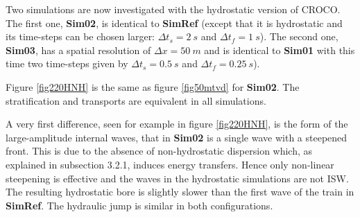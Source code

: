  Two simulations are now investigated with the hydrostatic version of CROCO. The first one, \textbf{Sim02}, is identical to \textbf{SimRef} (except that it is hydrostatic and its time-steps can be chosen larger: $\Delta t_s = 2\ s$ and $\Delta t_f = 1\ s$). The second one, \textbf{Sim03}, has a spatial resolution of $\Delta x = 50\ m$ and is identical to \textbf{Sim01} with this time two time-steps given by $\Delta t_s = 0.5\ s$ and $\Delta t_f = 0.25\ s$).

 Figure \ref{fig220HNH} %
 is the same as figure \ref{fig50mtvd}%
 for \textbf{Sim02}. The stratification and transports are equivalent in all simulations.
 
  

 A very first difference, seen for example in figure \ref{fig220HNH}, is the form of the large-amplitude internal waves, that in \textbf{Sim02} is a single wave with a steepened front. This is due to the absence of non-hydrostatic dispersion which, as explained in subsection 3.2.1, induces energy transfers. Hence only non-linear steepening is effective and the waves in the hydrostatic simulations are not ISW. The resulting hydrostatic bore is slightly slower than the first wave of the train in \textbf{SimRef}. The hydraulic jump is similar in both configurations.
 

